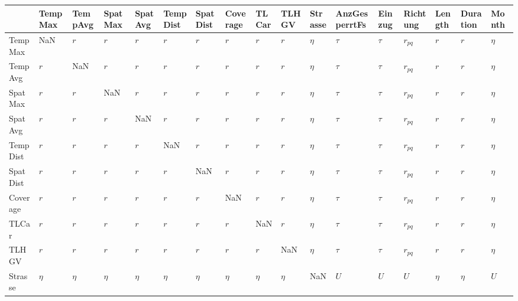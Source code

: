 \begin{tabular}{lllllllllllllllll}
\toprule
{} &   TempMax &   TempAvg &   SpatMax &   SpatAvg &  TempDist &  SpatDist &  Coverage &     TLCar &     TLHGV & Strasse & AnzGesperrtFs &  Einzug &  Richtung &    Length &  Duration &   Month \\
\midrule
TempMax       &       NaN &       $r$ &       $r$ &       $r$ &       $r$ &       $r$ &       $r$ &       $r$ &       $r$ &  $\eta$ &        $\tau$ &  $\tau$ &  $r_{pq}$ &       $r$ &       $r$ &  $\eta$ \\
TempAvg       &       $r$ &       NaN &       $r$ &       $r$ &       $r$ &       $r$ &       $r$ &       $r$ &       $r$ &  $\eta$ &        $\tau$ &  $\tau$ &  $r_{pq}$ &       $r$ &       $r$ &  $\eta$ \\
SpatMax       &       $r$ &       $r$ &       NaN &       $r$ &       $r$ &       $r$ &       $r$ &       $r$ &       $r$ &  $\eta$ &        $\tau$ &  $\tau$ &  $r_{pq}$ &       $r$ &       $r$ &  $\eta$ \\
SpatAvg       &       $r$ &       $r$ &       $r$ &       NaN &       $r$ &       $r$ &       $r$ &       $r$ &       $r$ &  $\eta$ &        $\tau$ &  $\tau$ &  $r_{pq}$ &       $r$ &       $r$ &  $\eta$ \\
TempDist      &       $r$ &       $r$ &       $r$ &       $r$ &       NaN &       $r$ &       $r$ &       $r$ &       $r$ &  $\eta$ &        $\tau$ &  $\tau$ &  $r_{pq}$ &       $r$ &       $r$ &  $\eta$ \\
SpatDist      &       $r$ &       $r$ &       $r$ &       $r$ &       $r$ &       NaN &       $r$ &       $r$ &       $r$ &  $\eta$ &        $\tau$ &  $\tau$ &  $r_{pq}$ &       $r$ &       $r$ &  $\eta$ \\
Coverage      &       $r$ &       $r$ &       $r$ &       $r$ &       $r$ &       $r$ &       NaN &       $r$ &       $r$ &  $\eta$ &        $\tau$ &  $\tau$ &  $r_{pq}$ &       $r$ &       $r$ &  $\eta$ \\
TLCar         &       $r$ &       $r$ &       $r$ &       $r$ &       $r$ &       $r$ &       $r$ &       NaN &       $r$ &  $\eta$ &        $\tau$ &  $\tau$ &  $r_{pq}$ &       $r$ &       $r$ &  $\eta$ \\
TLHGV         &       $r$ &       $r$ &       $r$ &       $r$ &       $r$ &       $r$ &       $r$ &       $r$ &       NaN &  $\eta$ &        $\tau$ &  $\tau$ &  $r_{pq}$ &       $r$ &       $r$ &  $\eta$ \\
Strasse       &    $\eta$ &    $\eta$ &    $\eta$ &    $\eta$ &    $\eta$ &    $\eta$ &    $\eta$ &    $\eta$ &    $\eta$ &     NaN &           $U$ &     $U$ &       $U$ &    $\eta$ &    $\eta$ &     $U$ \\

\end{tabular}
